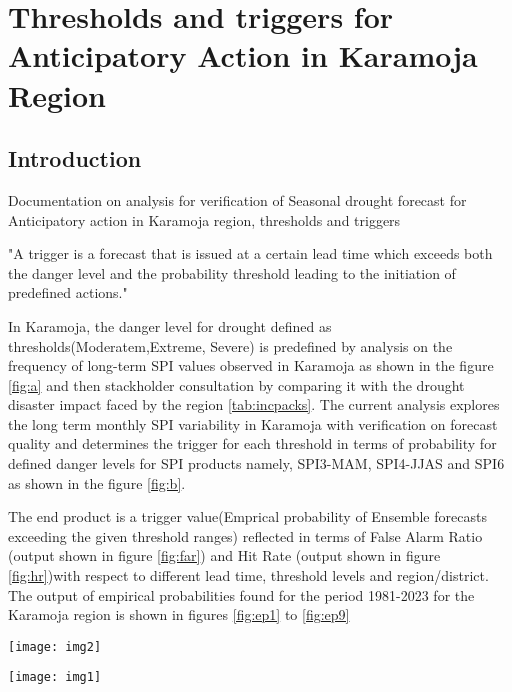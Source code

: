 
\chapter{Thresholds and triggers for Anticipatory Action in Karamoja Region}


\section{Introduction} 

Documentation on analysis for verification of Seasonal drought forecast for Anticipatory action in Karamoja region, thresholds and triggers 

"A trigger is a forecast that is issued at a certain lead time which exceeds both the danger level and the probability threshold leading to the initiation of predefined actions."

In Karamoja, the danger level for drought defined as thresholds(Moderatem,Extreme, Severe) is predefined by analysis on the frequency of long-term SPI values observed in Karamoja as shown in the figure \ref{fig:a} and then stackholder consultation by comparing it with the drought disaster impact faced by the region \ref{tab:incpacks}. The current analysis explores the long term monthly SPI variability in Karamoja with verification on forecast quality and determines the trigger for each threshold in terms of probability for defined danger levels for SPI products namely, SPI3-MAM, SPI4-JJAS and SPI6 as shown in the figure \ref{fig:b}.

The end product is a trigger value(Emprical probability of Ensemble forecasts exceeding the given threshold ranges) reflected in terms of False Alarm Ratio (output shown in figure \ref{fig:far}) and Hit Rate (output shown in figure \ref{fig:hr})with respect to different lead time, threshold levels and region/district. The output of empirical probabilities found for the period 1981-2023 for the Karamoja region is shown in figures \ref{fig:ep1} to \ref{fig:ep9}

\begin{figure*}
	\center
	{\texttt{[image: img2]}}
	\caption{Threshold selection for Karamoja region based on long term observed SPI values}\label{fig:a}
\end{figure*}


\begin{figure*}
\center
{\texttt{[image: img1]}}
\caption{Lead time and SPI products available for verification for Karamjoa region based on Growing and rainy season}\label{fig:b}
\end{figure*}


